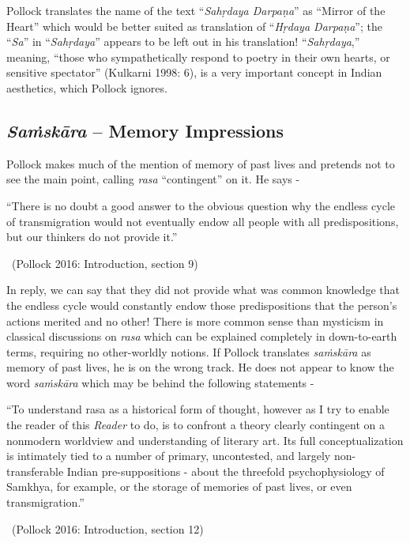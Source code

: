 Pollock translates the name of the text “\textit{Sahṛdaya Darpaṇa}” as “Mirror of the Heart” which would be better suited as translation of “\textit{Hṛdaya Darpaṇa}”; the “\textit{Sa}” in “\textit{Sahṛdaya}” appears to be left out in his translation! “\textit{Sahṛdaya},” meaning, “those who sympathetically respond to poetry in their own hearts, or sensitive spectator” (Kulkarni 1998: 6), is a very important concept in Indian aesthetics, which Pollock ignores.


\subsection*{\textit{Saṁskāra} – Memory Impressions}

Pollock makes much of the mention of memory of past lives and pretends not to see the main point, calling \textit{rasa} “contingent” on it. He says -

\begin{myquote}
“There is no doubt a good answer to the obvious question why the endless cycle of transmigration would not eventually endow all people with all predispositions, but our thinkers do not provide it.” 

~\hfill (Pollock 2016: Introduction, section 9)
\end{myquote}

In reply, we can say that they did not provide what was common knowledge that the endless cycle would constantly endow those predispositions that the person’s actions merited and no other! There is more common sense than mysticism in classical discussions on \textit{rasa} which can be explained completely in down-to-earth terms, requiring no other-worldly notions. If Pollock translates \textit{saṁskāra} as memory of past lives, he is on the wrong track. He does not appear to know the word \textit{saṁskāra} which may be behind the following statements -

\begin{myquote}
“To understand rasa as a historical form of thought, however as I try to enable the reader of this \textit{Reader} to do, is to confront a theory clearly contingent on a nonmodern worldview and understanding of literary art. Its full conceptualization is intimately tied to a number of primary, uncontested, and largely non-transferable Indian pre-suppositions - about the threefold psychophysiology of Samkhya, for example, or the storage of memories of past lives, or even transmigration.” 

~\hfill (Pollock 2016: Introduction, section 12)
\end{myquote}

